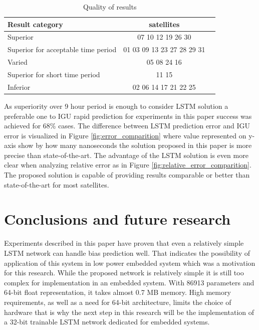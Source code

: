 \documentclass{article}
\begin{document}
\begin{table}[htb] \label{table:result}
\parindent0pt
\caption{Quality of results }
\centering
\begin{tabular}{ l  c  c }
  \hline
  \hline
  Result category & satellites\\  \hline
  Superior & 07 10 12 19 26 30\\  
  Superior for acceptable time period& 01 03 09 13 23 27 28 29 31\\ 
  Varied & 05 08 24 16\\ \hline \hline
  Superior for short time period& 11 15 \\ 
  Inferior & 02 06 14 17 21 22 25\\ 
 \end{tabular}
\end{table}

As superiority over 9 hour period is enough to consider LSTM solution a preferable one to
IGU rapid prediction for experiments in this paper success was achieved for 68\% 
cases.
The difference between LSTM prediction error and IGU error is visualized in Figure 
\ref{fig:error_comparition} where value represented on y-axis show by how many nanoseconds 
the solution proposed in this paper is more precise than state-of-the-art.
The advantage of the LSTM solution is even more clear when analyzing relative error as in Figure
\ref{fig:relative_error_comparition}. The proposed solution is capable of providing results comparable or better than state-of-the-art for most satellites.

\section{Conclusions and future research}
Experiments described in this paper have proven that even a relatively simple LSTM network can
handle bias prediction well. That indicates the possibility of application of this system in low power embedded system which was a motivation for this research.
While the proposed network is relatively simple it is still too complex for implementation in an embedded system. With 86913 parameters and 64-bit float representation, it takes almost 0.7 MB
memory.
High memory requirements, as well as a need for 64-bit architecture, limits the choice of hardware that
is why the next step in this research will be the implementation of a 32-bit trainable LSTM network
dedicated for embedded systems.
\end{document}
